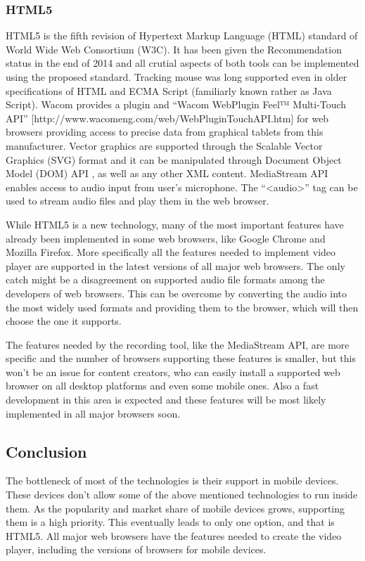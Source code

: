 \subsubsection{HTML5}
HTML5 is the fifth revision of Hypertext Markup Language (HTML) standard of World Wide Web Consortium (W3C). It has been given the Recommendation status in the end of 2014 and all crutial aspects of both tools can be implemented using the proposed standard. Tracking mouse was long supported even in older specifications of HTML and ECMA Script (familiarly known rather as Java Script). Wacom provides a plugin and ``Wacom WebPlugin Feel™ Multi-Touch API'' [http://www.wacomeng.com/web/WebPluginTouchAPI.htm] for web browsers providing access to precise data from graphical tablets from this manufacturer. Vector graphics are supported through the Scalable Vector Graphics (SVG) format \cite{} and it can be manipulated through Document Object Model (DOM) API \cite{}, as well as any other XML content. MediaStream API \cite{} enables access to audio input from user's microphone. The ``<audio>'' tag can be used to stream audio files and play them in the web browser.

While HTML5 is a new technology, many of the most important features have already been implemented in some web browsers, like Google Chrome and Mozilla Firefox. More specifically all the features needed to implement video player are supported in the latest versions of all major web browsers. The only catch might be a disagreement on supported audio file formats among the developers of web browsers. This can be overcome by converting the audio into the most widely used formats and providing them to the browser, which will then choose the one it supports.

The features needed by the recording tool, like the MediaStream API, are more specific and the number of browsers supporting these features is smaller, but this won't be an issue for content creators, who can easily install a supported web browser on all desktop platforms and even some mobile ones. Also a fast development in this area is expected and these features will be most likely implemented in all major browsers soon.

\subsection{Conclusion}
The bottleneck of most of the technologies is their support in mobile devices. These devices don't allow some of the above mentioned technologies to run inside them. As the popularity and market share of mobile devices grows, supporting them is a high priority. This eventually leads to only one option, and that is HTML5. All major web browsers have the features needed to create the video player, including the versions of browsers for mobile devices.

